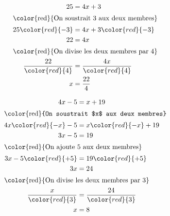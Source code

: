 \begin{exemple*1}
    \phantom{rrr}

    \begin{minipage}{0.5\linewidth}    
        \begin{center}
            \begin{align*}
                25&=4x+3\\\intertext{\color{red}{On soustrait 3 aux deux membres}}
                25\color{red}{-3}&=4x+3\color{red}{-3}\\
                22&=4x\\\intertext{\color{red}{On divise les deux membres par 4}}
                \dfrac{22}{\color{red}{4}}&=\frac{4x}{\color{red}{4}}\\
                x&=\frac{22}{4}\\
            \end{align*}
        \end{center}
    \end{minipage}
    \begin{minipage}{0.5\linewidth}    
        \begin{center}
            \begin{align*}
                4x-5&=x+19\\\intertext{\color{red}{On soustrait $x$ aux deux membres}}
                4x\color{red}{-x}-5&=x\color{red}{-x}+19\\
                3x-5&=19\\\intertext{\color{red}{On ajoute 5 aux deux membres}}
                3x-5\color{red}{+5}&=19\color{red}{+5}\\
                3x&=24\\\intertext{\color{red}{On divise les deux membres par 3}}
                \frac{x}{\color{red}{3}}&=\frac{24}{\color{red}{3}}\\
                x&=8\\
            \end{align*}
        \end{center}
    \end{minipage}


\end{exemple*1}
